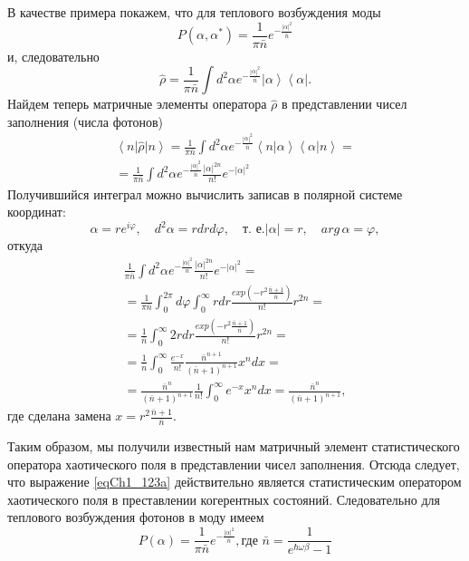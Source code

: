 В качестве примера покажем, что для теплового возбуждения моды 
\begin{equation}
P\left(\alpha, \alpha^{*}\right) = \frac{1}{\pi \bar{n}}
e^{- \frac{\left|\alpha\right|^2}{\bar{n}}}
\label{eqCh1_123a}
\end{equation}
и, следовательно
\[
\hat{\rho} = \frac{1}{\pi \bar{n}}
\int d^2 \alpha 
e^{- \frac{\left|\alpha\right|^2}{\bar{n}}}
\left|\alpha\right>
\left<\alpha\right|.
\]
Найдем теперь матричные элементы оператора $\hat{\rho}$ в
представлении чисел заполнения (числа фотонов)
\begin{eqnarray}
\left<n\right|
\hat{\rho}
\left|n\right> = 
\frac{1}{\pi \bar{n}}
\int d^2 \alpha 
e^{- \frac{\left|\alpha\right|^2}{\bar{n}}}
\left<n\right|\left.\alpha\right>
\left<\alpha\right|
\left.n\right> = 
\nonumber \\
= 
\frac{1}{\pi \bar{n}}
\int d^2 \alpha 
e^{- \frac{\left|\alpha\right|^2}{\bar{n}}}
\frac{\left|\alpha\right|^{2n}}{n!} 
e^{- \left|\alpha\right|^2} 
\nonumber 
\end{eqnarray}
Получившийся интеграл можно вычислить записав в полярной системе координат:
\[
\alpha = r e^{i \varphi}, \quad 
d^2 \alpha = r d r d \varphi , \quad 
\mbox{т. е.} 
\left|\alpha\right| = r, \quad arg\,\alpha = \varphi,
\]
откуда
\begin{eqnarray}
\frac{1}{\pi \bar{n}}
\int d^2 \alpha 
e^{- \frac{\left|\alpha\right|^2}{\bar{n}}}
\frac{\left|\alpha\right|^{2n}}{n!} 
e^{- \left|\alpha\right|^2} =
\nonumber \\
=
\frac{1}{\pi \bar{n}}
\int_0^{2 \pi} d \varphi 
\int_0^{\infty}
r dr \frac{exp \left(- r^2\frac{\bar{n} + 1}{\bar{n}}\right)}{n!} r^{2n}= 
\nonumber \\
= 
\frac{1}{\bar{n}}
\int_0^{\infty}
2 r dr \frac{exp \left(- r^2\frac{\bar{n} + 1}{\bar{n}}\right)}{n!}  r^{2n} = 
\nonumber \\
= 
\frac{1}{\bar{n}}
\int_0^{\infty}
\frac{e^{-x}}{n!}\frac{\bar{n}^{n + 1}}
{\left(\bar{n} + 1\right)^{n + 1}}x^n dx = 
\nonumber \\
=
\frac{\bar{n}^{n}}
{\left(\bar{n} + 1\right)^{n + 1}}
\frac{1}{n!}
\int_0^{\infty}
e^{-x}x^n dx = 
\frac{\bar{n}^{n}}
{\left(\bar{n} + 1\right)^{n + 1}},
\label{eqCh1_matrelemRho}
\end{eqnarray}
где сделана замена $x = r^2\frac{\bar{n} + 1}{\bar{n}}$.

Таким образом, мы получили известный нам матричный элемент
статистического оператора хаотического поля в представлении чисел
заполнения. Отсюда следует, что выражение \eqref{eqCh1_123a}
действительно является статистическим оператором хаотического поля в
преставлении когерентных состояний. Следовательно для теплового
возбуждения фотонов в моду имеем
\begin{equation}
P\left(\alpha\right) = \frac{1}{\pi \bar{n}}
e^{-\frac{\left|\alpha\right|^2}{\bar{n}}},
\mbox{где }
\bar{n} = \frac{1}{e^{\hbar \omega \beta} - 1}
\label{eqCh1_task4}
\end{equation}
  
